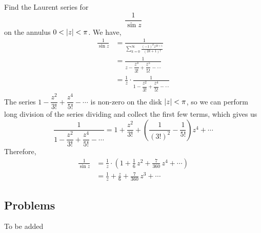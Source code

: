 \begin{example}
Find the Laurent series for
\[\frac{1}{\sin z}\]
on the annulus $0 < \left\lvert z\right\rvert < \pi$. We have,
\begin{align*}
\frac{1}{\sin z} &= \frac{1}{\displaystyle\sum_{k=0}^\infty\frac{(-1)^kz^{2k+1}}{(2k+1)!}}\\[1em]
&= \frac{1}{z - \dfrac{z^3}{3!} + \dfrac{z^5}{5!}-\cdots}\\[1em]
&= \frac{1}{z}\cdot\frac{1}{1 - \dfrac{z^2}{3!} + \dfrac{z^4}{5!}-\cdots}
\end{align*}
The series $1 - \dfrac{z^2}{3!} + \dfrac{z^4}{5!}-\cdots$ is non-zero on the disk $\left\lvert z\right\rvert < \pi$, so we can perform long division of the series dividing and collect the first few terms, which gives us
\[\frac{1}{1 - \dfrac{z^2}{3!} + \dfrac{z^4}{5!}-\cdots} = 1 + \frac{z^2}{3!} + \left(\frac{1}{(3!)^2} - \frac{1}{5!}\right)z^4 + \cdots\]
Therefore,
\begin{align*}
\frac{1}{\sin z} &= \frac{1}{z}\cdot\left(1 + \frac{1}{6}\,z^2 + \frac{7}{360}\,z^4 + \cdots\right)\\[0.5em]
 &= \frac{1}{z} + \frac{z}{6} + \frac{7}{360}\,z^3 + \cdots
\end{align*}
\end{example}

\vspace*{2em}

\subsection{Problems}
\vspace{0.1in}
To be added
%

